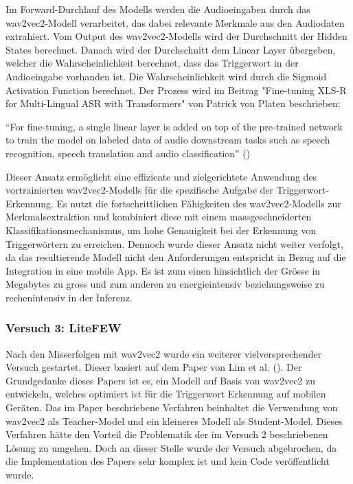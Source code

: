 \documentclass[11pt,a4paper]{article}
\begin{document}
\noindent \newline
Im Forward-Durchlauf des Modells werden die Audioeingaben durch das wav2vec2-Modell verarbeitet, 
das dabei relevante Merkmale aus den Audiodaten extrahiert. Vom Output des wav2vec2-Modells wird 
der Durchschnitt der Hidden States berechnet. Danach wird der Durchschnitt dem Linear Layer 
übergeben, welcher die Wahrscheinlichkeit berechnet, dass das Triggerwort in der Audioeingabe
vorhanden ist. Die Wahrscheinlichkeit wird durch die Sigmoid Activation Function berechnet. Der 
Prozess wird im Beitrag "Fine-tuning XLS-R for Multi-Lingual ASR with Transformers" von Patrick 
von Platen beschrieben:

\begin{displayquote}
	``For fine-tuning, a single linear layer is added on top of the pre-trained network to train 
	the model on labeled data of audio downstream tasks such as speech recognition, speech 
	translation and audio classification'' 
	(\cite{platen2021finetune})
\end{displayquote}

\noindent \newline
Dieser Ansatz ermöglicht eine effiziente und zielgerichtete Anwendung des vortrainierten 
wav2vec2-Modells für die spezifische Aufgabe der Triggerwort-Erkennung. Es nutzt die 
fortschrittlichen Fähigkeiten des wav2vec2-Modells zur Merkmalsextraktion und kombiniert 
diese mit einem massgeschneiderten Klassifikationsmechanismus, um hohe Genauigkeit bei der 
Erkennung von Triggerwörtern zu erreichen. Dennoch wurde dieser Ansatz nicht weiter verfolgt, da 
das resultierende Modell nicht den Anforderungen entspricht in Bezug auf die Integration in eine 
mobile App. Es ist zum einen hinsichtlich der Grösse in Megabytes zu gross und zum anderen zu 
energieintensiv beziehungsweise zu rechenintensiv in der Inferenz. 



\subsubsection{Versuch 3: LiteFEW}
Nach den Misserfolgen mit wav2vec2 wurde ein weiterer vielversprechender Versuch gestartet. Dieser 
basiert auf dem Paper von Lim et al. (\cite{lim2023lightweight}). Der Grundgedanke dieses Papers 
ist es, ein Modell auf Basis von wav2vec2 zu entwickeln, welches optimiert ist für die Triggerwort 
Erkennung auf mobilen Geräten. Das im Paper beschriebene Verfahren beinhaltet die Verwendung von 
wav2vec2 als Teacher-Model und ein kleineres Modell als Student-Model. Dieses Verfahren hätte 
den Vorteil die Problematik der im Versuch 2 beschriebenen Lösung zu umgehen. Doch an dieser Stelle 
wurde der Versuch abgebrochen, da die Implementation des Papers sehr komplex ist und kein Code 
veröffentlicht wurde.
\end{document}
